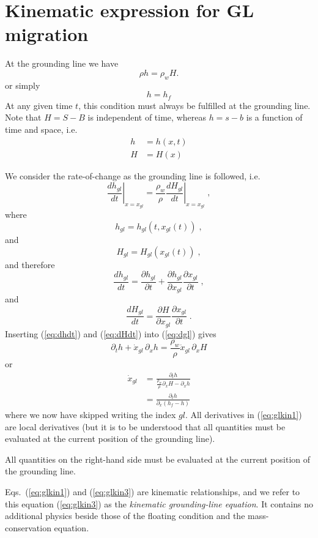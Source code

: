 \documentclass[10pt,a4paper]{book}
\newcommand{\p}{\partial}
\begin{document}

\section{Kinematic expression for GL migration }

At the grounding line we have
\[
\rho h =\rho_w H.
\]
or simply
\[
 h=h_f
\]
At any given time $t$, this condition must always be fulfilled at the
grounding line.  Note that $H=S-B$ is independent of time, whereas
$h=s-b$ is a function of time and space, i.e.
\begin{align*}
 h&=h(x,t) \\
 H&=H(x)
\end{align*} 


We consider the rate-of-change as the grounding line
is followed, i.e.\
\begin{equation}
\left . \frac{d h_{gl}}{dt} \right |_{x=x_{gl}} = \frac{\rho_w}{\rho} \left . \frac{d H_{gl}}{dt}\right |_{x=x_{gl}}  \; ,
\label{eq:dgl}
\end{equation}
where
\[
h_{gl}=h_{gl}(t,x_{gl}(t))\;,
\] 
and
\[
H_{gl}=H_{gl}(x_{gl}(t))\;,
\] 
and therefore
\begin{equation}
\frac{d h_{gl}}{dt}=\frac{\p h_{gl}}{\p t} + \frac{\p h_{gl}}{\p x_{gl}} \frac{\p x_{gl}}{\p t}\;,
\label{eq:dhdt}
\end{equation}
and
\begin{equation}
\frac{d H_{gl}}{dt}=\frac{\p H}{\p x_{gl}} \frac{\p x_{gl}}{\p t}\;.
\label{eq:dHdt}
\end{equation}
Inserting (\ref{eq:dhdt}) and (\ref{eq:dHdt}) into (\ref{eq:dgl}) gives
\[
\p_t h + \dot{x}_{gl} \, \p_x h = \frac{\rho_w}{\rho} \dot{x}_{gl} \, \p_x H 
\]
or
\begin{align}
\dot{x}_{gl} & = \frac{\p_t h}{\frac{\rho_w}{\rho}\p_x H - \p_x h}  \label{eq:glkin1}\\
            & = \frac{\p_t h }{\p_x (h_f -  h)}                 \label{eq:glkin3}
\end{align}
where we now have skipped writing the index $gl$. All derivatives in
(\ref{eq:glkin1}) are local derivatives (but it is to be understood
that all quantities must be evaluated at the current position of the
grounding line). 


All quantities on the right-hand side must be evaluated at the current
position of the grounding line.  

Eqs.~(\ref{eq:glkin1}) and (\ref{eq:glkin3}) are kinematic relationships,
and we refer to this equation (\ref{eq:glkin3}) as the {\em kinematic
  grounding-line equation}. It contains no additional physics beside
those of the floating condition and the mass-conservation equation.
\end{document}

